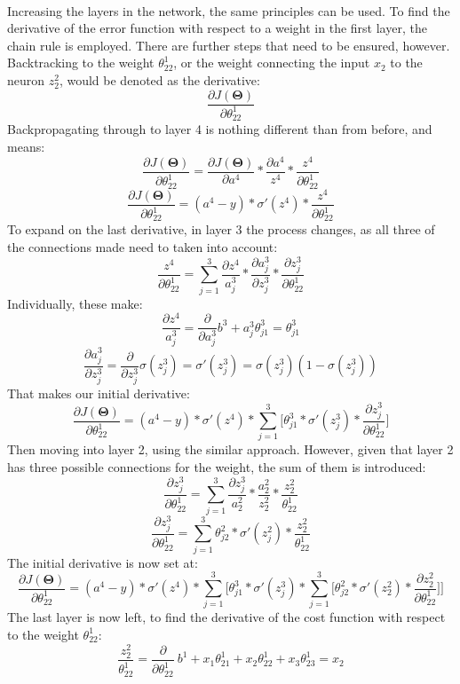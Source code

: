 \documentclass[a4paper,12pt]{article}
\begin{document}
\\
Increasing the layers in the network, the same principles can be used. To find the derivative of the error function with respect to a weight in the first layer, the chain rule is employed. There are further steps that need to be ensured, however. Backtracking to the weight $\theta^1_{22}$, or the weight connecting the input $x_2$ to the neuron $z^2_2$, would be denoted as the derivative:
\[\frac{\partial J(\boldsymbol{\Theta})}{\partial \theta^1_{22}}\]
Backpropagating through to layer 4 is nothing different than from before, and means:
\[\frac{\partial J(\boldsymbol{\Theta})}{\partial \theta^1_{22}} = \frac{\partial J(\boldsymbol{\Theta})}{\partial a^4} * \frac{\partial a^4}{z^4} * \frac{z^4}{\partial \theta_{22}^1}\]
\[\frac{\partial J(\boldsymbol{\Theta})}{\partial \theta^1_{22}} = (a^4 - y) * \sigma'(z^4) * \frac{z^4}{\partial \theta_{22}^1}\]
To expand on the last derivative, in layer 3 the process changes, as all three of the connections made need to taken into account:
\[\frac{z^4}{\partial \theta_{22}^1} = \sum_{j=1}^3 \frac{\partial z^4}{a^3_j} * \frac{\partial a^3_j}{\partial z^3_j} * \frac{\partial z^3_j}{\partial \theta_{22}^1}\]
Individually, these make:
\[\frac{\partial z^4}{a^3_j} = \frac{\partial}{\partial a^3_j} b^3 + a^3_j\theta^3_{j1} = \theta^3_{j1}\]
\[\frac{\partial a^3_j}{\partial z^3_j} = \frac{\partial }{\partial z^3_j} \sigma(z^3_j) = \sigma'(z^3_j) = \sigma(z^3_j)(1-\sigma(z^3_j))\]
That makes our initial derivative:
\[\frac{\partial J(\boldsymbol{\Theta})}{\partial \theta^1_{22}} = (a^4 - y) * \sigma'(z^4) * \sum_{j=1}^3 \Big[\theta^3_{j1} * \sigma'(z^3_j) * \frac{\partial z^3_j}{\partial \theta^1_{22}}\Big]\]
Then moving into layer 2, using the similar approach. However, given that layer 2 has three possible connections for the weight, the sum of them is introduced:
\[\frac{\partial z^3_j}{\partial \theta^1_{22}} = \sum_{j=1}^{3} \frac{\partial z^3_j}{a^2_2} * \frac{a^2_2}{z^2_2} * \frac{z^2_2}{\theta_{22}^1}\]
\[\frac{\partial z^3_j}{\partial \theta^1_{22}} = \sum_{j=1}^{3} \theta^2_{j2} * \sigma'(z^2_j) * \frac{z^2_2}{\theta_{22}^1}\]
The initial derivative is now set at:
\[\frac{\partial J(\boldsymbol{\Theta})}{\partial \theta^1_{22}} = (a^4 - y) * \sigma'(z^4) * \sum_{j=1}^3 \Big[\theta^3_{j1} * \sigma'(z^3_j) * \sum_{j=1}^{3} \Big[ \theta^2_{j2} * \sigma'(z^2_2) * \frac{\partial z^2_2}{\partial \theta_{22}^1}\Big]\Big]\]
The last layer is now left, to find the derivative of the cost function with respect to the weight $\theta_{22}^1$:
\[\frac{z^2_2}{\theta_{22}^1} = \frac{\partial}{\partial \theta_{22}^1} \ b^1 + x_1\theta_{21}^1 + x_2\theta_{22}^1 + x_3\theta^1_{23} = x_2\]
\end{document}
